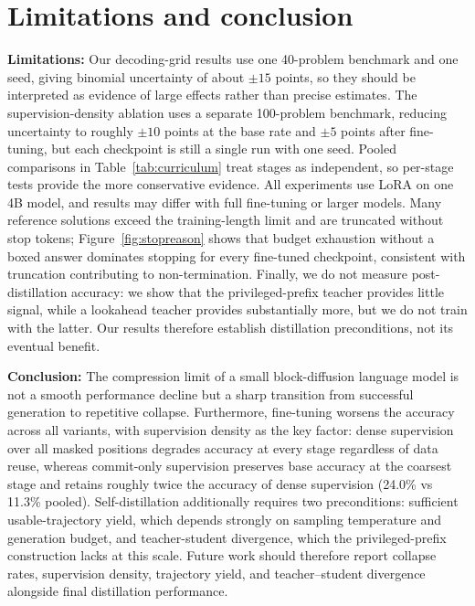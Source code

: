 \documentclass{article}
\begin{document}
\section{Limitations and conclusion}
\label{sec:conclusion}

\textbf{Limitations:} Our decoding-grid results use one 40-problem benchmark and one seed, giving binomial uncertainty of about $\pm15$ points, so they should be interpreted as evidence of large effects rather than precise estimates. The supervision-density ablation uses a separate 100-problem benchmark, reducing uncertainty to roughly $\pm10$ points at the base rate and $\pm5$ points after fine-tuning, but each checkpoint is still a single run with one seed. Pooled comparisons in Table~\ref{tab:curriculum} treat stages as independent, so per-stage tests provide the more conservative evidence. All experiments use LoRA on one 4B model, and results may differ with full fine-tuning or larger models. Many reference solutions exceed the training-length limit and are truncated without stop tokens; Figure~\ref{fig:stopreason} shows that budget exhaustion without a boxed answer dominates stopping for every fine-tuned checkpoint, consistent with truncation contributing to non-termination. Finally, we do not measure post-distillation accuracy: we show that the privileged-prefix teacher provides little signal, while a lookahead teacher provides substantially more, but we do not train with the latter. Our results therefore establish distillation preconditions, not its eventual benefit.

\textbf{Conclusion:} The compression limit of a small block-diffusion language model is not a smooth performance decline but a sharp transition from successful generation to repetitive collapse. Furthermore, fine-tuning worsens the accuracy across all variants, with supervision density as the key factor: dense supervision over all masked positions degrades accuracy at every stage regardless of data reuse, whereas commit-only supervision preserves base accuracy at the coarsest stage and retains roughly twice the accuracy of dense supervision (24.0\% vs 11.3\% pooled). Self-distillation additionally requires two preconditions: sufficient usable-trajectory yield, which depends strongly on sampling temperature and generation budget, and teacher-student divergence, which the privileged-prefix construction lacks at this scale. Future work should therefore report collapse rates, supervision density, trajectory yield, and teacher--student divergence alongside final distillation performance.
\end{document}

